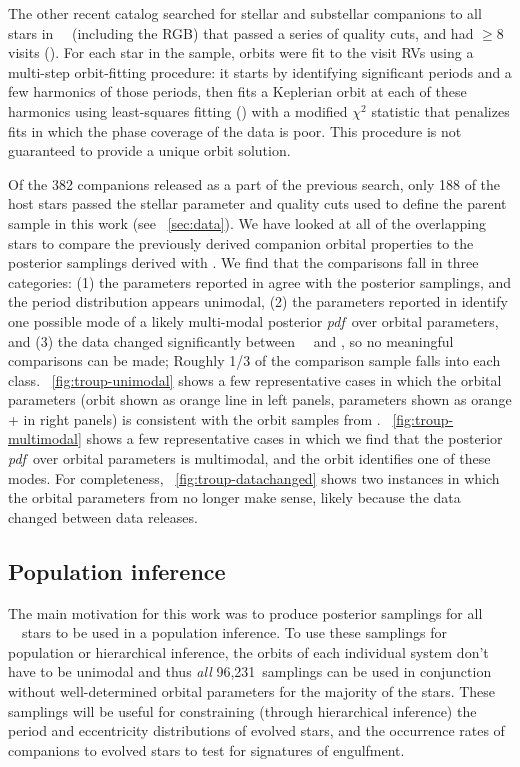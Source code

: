 \documentclass[modern, letterpaper]{aastex62}
\newcommand{\apogee}{\project{\acronym{APOGEE}}}
\newcommand{\thejoker}{\project{The~Joker}}
\newcommand{\DR}{\acronym{DR14}}
\newcommand{\DRtw}{\acronym{DR12}}
\newcommand{\pdf}{\textit{pdf}}
\newcommand{\nstars}{96,231}
\begin{document}
The other recent catalog searched for stellar and substellar companions to all
stars in \apogee\ \DRtw\ (including the RGB) that passed a series of quality
cuts, and had $\geq 8$ visits (\citealt{Troup:2016}).
For each star in the sample, orbits were fit to the visit RVs using a multi-step
orbit-fitting procedure: it starts by identifying significant periods and a few
harmonics of those periods, then fits a Keplerian orbit at each of these
harmonics using least-squares fitting (\citealt{De-Lee:2013}) with a modified
$\chi^2$ statistic that penalizes fits in which the phase coverage of the data
is poor.
This procedure is not guaranteed to provide a unique orbit solution.

Of the 382 companions released as a part of the previous search, only 188 of the
host stars passed the stellar parameter and quality cuts used to define the
parent sample in this work (see \sectionname~\ref{sec:data}).
We have looked at all of the overlapping stars to compare the previously derived
companion orbital properties to the posterior samplings derived with \thejoker.
We find that the comparisons fall in three categories:
(1) the parameters reported in \citet{Troup:2016} agree with the posterior
samplings, and the period distribution appears unimodal,
(2) the parameters reported in \citet{Troup:2016} identify one possible mode of
a likely multi-modal posterior \pdf\ over orbital parameters, and
(3) the data changed significantly between \apogee\ \DRtw\ and \DR, so
no meaningful comparisons can be made; Roughly 1/3 of the comparison sample
falls into each class.
\figurename~\ref{fig:troup-unimodal} shows a few representative cases in which
the \citet{Troup:2016} orbital parameters (orbit shown as orange line in left
panels, parameters shown as orange + in right panels) is consistent with the
orbit samples from \thejoker.
\figurename~\ref{fig:troup-multimodal} shows a few representative cases in which
we find that the posterior \pdf\ over orbital parameters is multimodal, and the
\citet{Troup:2016} orbit identifies one of these modes.
For completeness, \figurename~\ref{fig:troup-datachanged} shows two instances in
which the orbital parameters from \citet{Troup:2016} no longer make sense,
likely because the data changed between data releases.

\subsection{Population inference}

The main motivation for this work was to produce posterior samplings for all
\apogee\ \DR\ stars to be used in a population inference.
To use these samplings for population or hierarchical inference, the orbits of
each individual system don't have to be unimodal and thus \emph{all} \nstars\
samplings can be used in conjunction without well-determined orbital parameters
for the majority of the stars.
These samplings will be useful for constraining (through hierarchical inference)
the period and eccentricity distributions of evolved stars, and the occurrence
rates of companions to evolved stars to test for signatures of engulfment.
\end{document}
